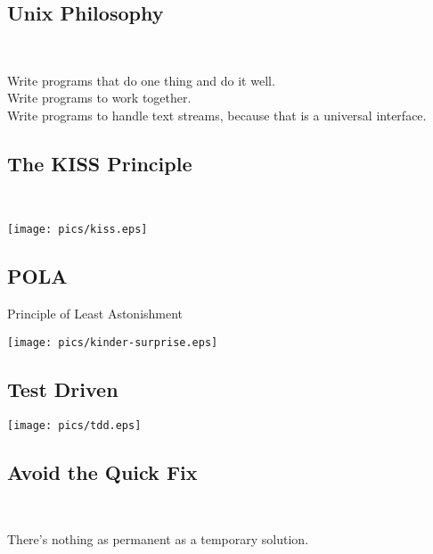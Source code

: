 \documentclass[xga]{xdvislides}
\begin{document}
\subsection{Unix Philosophy}
\\
\Huge
\begin{center}
	Write programs that do one thing and do it well.\\
	\vspace{.5in}
	Write programs to work together. \\
	\vspace{.5in}
	Write programs to handle text streams, because that is a universal interface.
\end{center}
\Normalsize

\subsection{The KISS Principle}
\\
\vspace*{\fill}
\begin{center}
	\texttt{[image: pics/kiss.eps]}
\end{center}
\vspace*{\fill}

\subsection{POLA}
Principle of Least Astonishment
\\
\vspace*{\fill}
\begin{center}
	\texttt{[image: pics/kinder-surprise.eps]}
\end{center}
\vspace*{\fill}

\subsection{Test Driven}
\vspace*{\fill}
\begin{center}
	\texttt{[image: pics/tdd.eps]}
\end{center}
\vspace*{\fill}

\subsection{Avoid the Quick Fix}
\\
\Huge
\begin{center}
	There's nothing as permanent as a temporary solution.
\end{center}
\Normalsize
\end{document}
